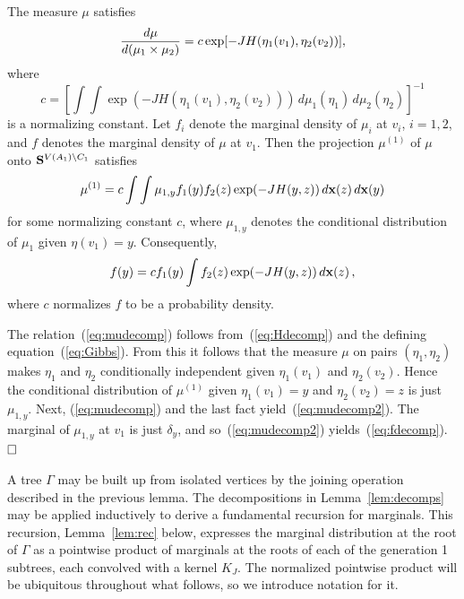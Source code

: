 \begin{lem} \label{lem:decomps}
The measure $\mu$ satisfies
\begin{equation} \label{eq:mudecomp}
{d\mu \over d (\mu_1 \times \mu_2)} = c \exp [- J H(\eta_1 (v_1) , 
   \eta_2 (v_2))] ,
\end{equation}
where 
$$c = \left [ \int \int \exp (- J H (\eta_1 (v_1) , \eta_2 (v_2))) 
   \, d\mu_1 (\eta_1) \, d\mu_2 (\eta_2) \right ]^{-1}$$
is a normalizing constant.  Let $f_i$ denote the marginal density
of $\mu_i$ at $v_i$, $i = 1 , 2$, and $f$ denotes the marginal
density of $\mu$ at $v_1$.  Then the projection $\mu^{(1)}$ of
$\mu$ onto $\S^{V(A_1)\setminus C_1}$ satisfies
\begin{equation} \label{eq:mudecomp2}
\mu^{(1)} = c \int \int \mu_{1 , y} f_1 (y) f_2 (z) \exp (- J H(y,z))
   \, \dx (z) \, \dx (y)
\end{equation}
for some normalizing constant $c$, where $\mu_{1 , y}$ denotes the
conditional distribution of $\mu_1$ given $\eta (v_1) = y$.  Consequently,
\begin{equation} \label{eq:fdecomp}
f (y) = c f_1 (y) \int f_2 (z) \exp (- J H(y,z)) \, \dx (z) \, ,
\end{equation}
where $c$ normalizes $f$ to be a probability density.  
\end{lem}

  The relation~(\ref{eq:mudecomp}) follows
from~(\ref{eq:Hdecomp}) and the defining equation~(\ref{eq:Gibbs}).  From 
this it follows that the measure $\mu$ on pairs $(\eta_1 , \eta_2)$
makes $\eta_1$ and $\eta_2$ conditionally independent given $\eta_1 (v_1)$
and $\eta_2 (v_2)$.  Hence the conditional distribution of $\mu^{(1)}$
given $\eta_1 (v_1) = y$ and $\eta_2 (v_2) = z$ is just $\mu_{1 , y}$.
Next, (\ref{eq:mudecomp}) and the last fact
yield~(\ref{eq:mudecomp2}).  The marginal of 
$\mu_{1, y}$ at $v_1$ is just $\delta_y$, and
so~(\ref{eq:mudecomp2}) yields~(\ref{eq:fdecomp}).  
$\qed$

A tree $\Gamma$ may be built up from isolated vertices by the joining 
operation described in the previous lemma.  The decompositions in 
Lemma~\ref{lem:decomps} may be applied inductively 
to derive a fundamental recursion for marginals.  This recursion, 
Lemma~\ref{lem:rec} below, expresses the marginal distribution
at the root of $\Gamma$ as a pointwise product of marginals at
the roots of each of the generation 1 subtrees, each convolved
with a kernel $K_J$.  The normalized pointwise product will be
ubiquitous throughout what follows, so we introduce notation for it.

